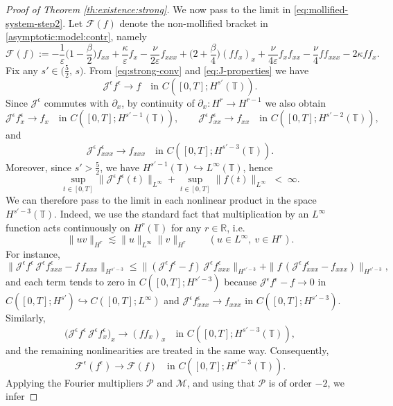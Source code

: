 \documentclass[reqno]{amsart}
\newcommand{\TT}{\mathbb T}
\theoremstyle{definition}
\numberwithin{equation}{section}
\numberwithin{theorem}{section}
\numberwithin{definition}{section}
\begin{document}
\begin{proof}[Proof of Theorem \ref{th:existence:strong}]
We now pass to the limit in \eqref{eq:mollified-system-step2}. Let $\mathcal{F}(f)$ denote the non-mollified bracket in
\eqref{asymptotic:model:contr}, namely
\[
\mathcal{F}(f):=
- \frac{1}{\varepsilon}\Big(1-\frac{\beta}{2}\Big) f_{xx}
+ \frac{\kappa}{\varepsilon} f_x
- \frac{\nu}{2\varepsilon} f_{xxx}
+ \Big(2+\frac{\beta}{4}\Big)(f f_x)_x
+ \frac{\nu}{4\varepsilon} f_x f_{xx}
- \frac{\nu}{4} f f_{xxx}
- 2\kappa f f_x .
\]
Fix any $s'\in\big(\frac52,\,s\big)$. From \eqref{eq:strong-conv} and \eqref{eq:J-properties} we have
\[
\mathcal{J}^\epsilon f^\epsilon \to f
\quad \text{in } C([0,T];H^{s'}(\TT)).
\]
Since $\mathcal{J}^\epsilon$ commutes with $\partial_x$, by continuity of $\partial_x:H^r\to H^{r-1}$ we also obtain
\[
\mathcal{J}^\epsilon f^\epsilon_x \to f_x \quad \text{in } C([0,T];H^{s'-1}(\TT)),\qquad
\mathcal{J}^\epsilon f^\epsilon_{xx} \to f_{xx} \quad \text{in } C([0,T];H^{s'-2}(\TT)),
\]
and
\[
\mathcal{J}^\epsilon f^\epsilon_{xxx} \to f_{xxx} \quad \text{in } C([0,T];H^{s'-3}(\TT)).
\]
Moreover, since $s'>\frac52$, we have $H^{s'-1}(\TT)\hookrightarrow L^\infty(\TT)$, hence
\[
\sup_{t\in[0,T]}\|\mathcal{J}^\epsilon f^\epsilon(t)\|_{L^\infty}
+\sup_{t\in[0,T]}\|f(t)\|_{L^\infty}
\;<\;\infty .
\]
We can therefore pass to the limit in each nonlinear product in the space $H^{s'-3}(\TT)$.
Indeed, we use the standard fact that multiplication by an $L^\infty$ function acts continuously on $H^r(\TT)$ for any
$r\in\mathbb{R}$, i.e.
\[
\|uv\|_{H^r}\lesssim \|u\|_{L^\infty}\|v\|_{H^r}\qquad (u\in L^\infty,\ v\in H^r).
\]
For instance,
\[
\|\mathcal{J}^\epsilon f^\epsilon\,\mathcal{J}^\epsilon f^\epsilon_{xxx}- f\,f_{xxx}\|_{H^{s'-3}}
\le
\|(\mathcal{J}^\epsilon f^\epsilon-f)\,\mathcal{J}^\epsilon f^\epsilon_{xxx}\|_{H^{s'-3}}
+\|f\,(\mathcal{J}^\epsilon f^\epsilon_{xxx}-f_{xxx})\|_{H^{s'-3}},
\]
and each term tends to zero in $C([0,T];H^{s'-3})$ because
$\mathcal{J}^\epsilon f^\epsilon-f\to0$ in $C([0,T];H^{s'})\hookrightarrow C([0,T];L^\infty)$ and
$\mathcal{J}^\epsilon f^\epsilon_{xxx}\to f_{xxx}$ in $C([0,T];H^{s'-3})$.
Similarly,
\[
\big(\mathcal{J}^\epsilon f^\epsilon\,\mathcal{J}^\epsilon f^\epsilon_x\big)_x \to (f f_x)_x
\quad\text{in } C([0,T];H^{s'-3}(\TT)),
\]
and the remaining nonlinearities are treated in the same way. Consequently,
\begin{equation}\label{eq:F-conv}
	\mathcal{F}^\epsilon(f^\epsilon)\to \mathcal{F}(f)
	\quad\text{in } C([0,T];H^{s'-3}(\TT)).
\end{equation}
Applying the Fourier multipliers $\mathcal{P}$ and $\mathcal{M}$, and using that $\mathcal{P}$ is of order $-2$, we infer

\end{proof}
\end{document}
